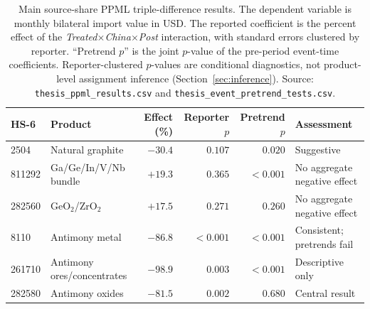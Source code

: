 \begin{table}[H]
\centering
\caption{Main source-share PPML triple-difference results. The dependent
variable is monthly bilateral import value in USD. The reported coefficient is
the percent effect of the \textit{Treated}$\times$\textit{China}$\times$\textit{Post}
interaction, with standard errors clustered by reporter. ``Pretrend $p$'' is the
joint $p$-value of the pre-period event-time coefficients. Reporter-clustered
$p$-values are conditional diagnostics, not product-level assignment inference
(Section~\ref{sec:inference}). Source:
\texttt{thesis\_ppml\_results.csv} and \texttt{thesis\_event\_pretrend\_tests.csv}.}
\label{tab:main_ddd}
\footnotesize
\begin{tabular}{llrrrl}
\toprule
HS-6 & Product & Effect (\%) & Reporter $p$ & Pretrend $p$ & Assessment \\
\midrule
2504   & Natural graphite           & $-30.4$  & $0.107$  & $0.020$ & Suggestive \\
811292 & Ga/Ge/In/V/Nb bundle      & $+19.3$  & $0.365$  & $<0.001$ & No aggregate negative effect \\
282560 & GeO$_2$/ZrO$_2$           & $+17.5$  & $0.271$  & $0.260$ & No aggregate negative effect \\
8110   & Antimony metal             & $-86.8$  & $<0.001$ & $<0.001$ & Consistent; pretrends fail \\
261710 & Antimony ores/concentrates & $-98.9$  & $0.003$  & $<0.001$ & Descriptive only \\
282580 & Antimony oxides            & $-81.5$  & $0.002$  & $0.680$ & Central result \\
\bottomrule
\end{tabular}
\end{table}
